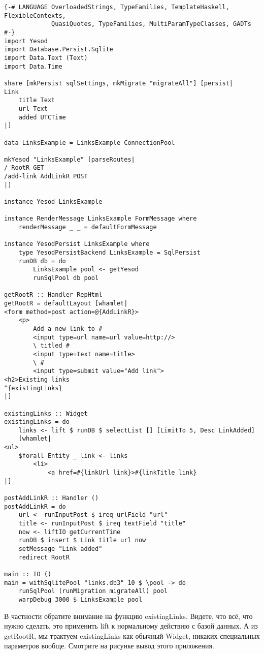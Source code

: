 \begin{lstlisting}
{-# LANGUAGE OverloadedStrings, TypeFamilies, TemplateHaskell, FlexibleContexts,
             QuasiQuotes, TypeFamilies, MultiParamTypeClasses, GADTs #-}
import Yesod
import Database.Persist.Sqlite
import Data.Text (Text)
import Data.Time

share [mkPersist sqlSettings, mkMigrate "migrateAll"] [persist|
Link
    title Text
    url Text
    added UTCTime
|]

data LinksExample = LinksExample ConnectionPool

mkYesod "LinksExample" [parseRoutes|
/ RootR GET
/add-link AddLinkR POST
|]

instance Yesod LinksExample

instance RenderMessage LinksExample FormMessage where
    renderMessage _ _ = defaultFormMessage

instance YesodPersist LinksExample where
    type YesodPersistBackend LinksExample = SqlPersist
    runDB db = do
        LinksExample pool <- getYesod
        runSqlPool db pool

getRootR :: Handler RepHtml
getRootR = defaultLayout [whamlet|
<form method=post action=@{AddLinkR}>
    <p>
        Add a new link to #
        <input type=url name=url value=http://>
        \ titled #
        <input type=text name=title>
        \ #
        <input type=submit value="Add link">
<h2>Existing links
^{existingLinks}
|]

existingLinks :: Widget
existingLinks = do
    links <- lift $ runDB $ selectList [] [LimitTo 5, Desc LinkAdded]
    [whamlet|
<ul>
    $forall Entity _ link <- links
        <li>
            <a href=#{linkUrl link}>#{linkTitle link}
|]

postAddLinkR :: Handler ()
postAddLinkR = do
    url <- runInputPost $ ireq urlField "url"
    title <- runInputPost $ ireq textField "title"
    now <- liftIO getCurrentTime
    runDB $ insert $ Link title url now
    setMessage "Link added"
    redirect RootR

main :: IO ()
main = withSqlitePool "links.db3" 10 $ \pool -> do
    runSqlPool (runMigration migrateAll) pool
    warpDebug 3000 $ LinksExample pool
\end{lstlisting}

В частности обратите внимание на функцию existingLinks. Видете, что всё, что нужно сделать, это применить lift к нормальному действию с базой данных. А из getRootR, мы трактуем existingLinks как обычный Widget, никаких специальных параметров вообще. Смотрите на рисунке вывод этого приложения.

